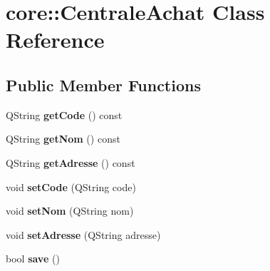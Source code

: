 \hypertarget{classcore_1_1_centrale_achat}{
\section{core::CentraleAchat Class Reference}
\label{db/d46/classcore_1_1_centrale_achat}
}
\subsection*{Public Member Functions}
\begin{DoxyCompactItemize}
\item 
\hypertarget{classcore_1_1_centrale_achat_a0cf6807c6d2534538f89af0ba30c2eee}{
QString {\bfseries getCode} () const }
\label{db/d46/classcore_1_1_centrale_achat_a0cf6807c6d2534538f89af0ba30c2eee}

\item 
\hypertarget{classcore_1_1_centrale_achat_ad7e7cbecb0b649309282c4af2af1d1a6}{
QString {\bfseries getNom} () const }
\label{db/d46/classcore_1_1_centrale_achat_ad7e7cbecb0b649309282c4af2af1d1a6}

\item 
\hypertarget{classcore_1_1_centrale_achat_aee4a53523764586d5e6279186d4da288}{
QString {\bfseries getAdresse} () const }
\label{db/d46/classcore_1_1_centrale_achat_aee4a53523764586d5e6279186d4da288}

\item 
\hypertarget{classcore_1_1_centrale_achat_a42d8887695c3c0cce5031b4e3885aa99}{
void {\bfseries setCode} (QString code)}
\label{db/d46/classcore_1_1_centrale_achat_a42d8887695c3c0cce5031b4e3885aa99}

\item 
\hypertarget{classcore_1_1_centrale_achat_a5f03e30b0df6695de16bcbd6a2d02983}{
void {\bfseries setNom} (QString nom)}
\label{db/d46/classcore_1_1_centrale_achat_a5f03e30b0df6695de16bcbd6a2d02983}

\item 
\hypertarget{classcore_1_1_centrale_achat_a0eaa5261057495f4c8d8aea1a4d2b52b}{
void {\bfseries setAdresse} (QString adresse)}
\label{db/d46/classcore_1_1_centrale_achat_a0eaa5261057495f4c8d8aea1a4d2b52b}

\item 
\hypertarget{classcore_1_1_centrale_achat_af5ffa8bf1bf1016027b35c1ec6136d13}{
bool {\bfseries save} ()}
\label{db/d46/classcore_1_1_centrale_achat_af5ffa8bf1bf1016027b35c1ec6136d13}

\end{DoxyCompactItemize}
